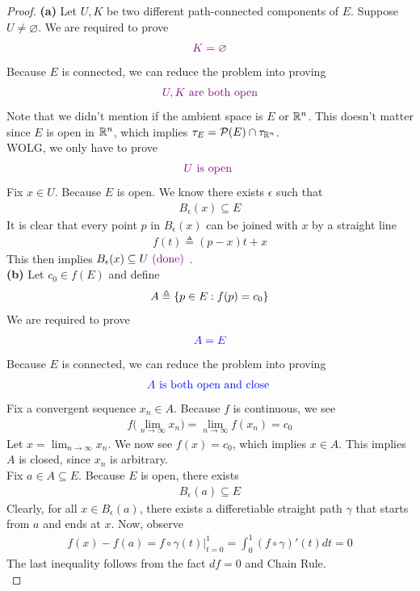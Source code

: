 \documentclass{report}
\begin{document}
\begin{proof}
\textbf{(a)} Let $U,K$ be two different path-connected components of $E$. Suppose $U\neq \varnothing$. We are required to prove 
 \begin{align*}
\textcolor{violet}{K=\varnothing}
\end{align*}
Because $E$ is connected, we can reduce the problem into proving 
\begin{align*}
  \textcolor{violet}{U,K\text{ are both open}}
\end{align*}
Note that we didn't mention if the ambient space is $E$ or  $\mathbb{R}^n$. This doesn't matter since  $E$ is open in  $\mathbb{R}^n$, which implies $\tau_{E}= \mathcal{P}(E)\cap \tau_{\mathbb{R}^n}$.\\

WOLG, we only have to prove 
\begin{align*}
\textcolor{violet}{U\text{ is open }}
\end{align*}
Fix $x \in U$. Because $E$ is open. We know there exists  $\epsilon $ such that 
\begin{align*}
B_\epsilon (x)\subseteq E
\end{align*}
It is clear that every point $p$ in  $B_\epsilon (x)$ can be joined with $x$ by a straight line 
\begin{align*}
f(t)\triangleq (p-x)t+x
\end{align*}
This then implies $B_\epsilon (x)\subseteq U\textcolor{violet}{\text{ (done) }}$.\\

\textbf{(b)} Let $c_0\in f(E)$ and define 
\begin{align*}
A\triangleq \{ p \in E: f(p)=c_0 \}
\end{align*}
We are required to prove 
\begin{align*}
  \textcolor{blue}{A=E}
\end{align*}
Because $E$ is connected, we can reduce the problem into proving 
\begin{align*}
\textcolor{blue}{A\text{ is both open and close }}
\end{align*}
Fix a convergent sequence $x_n \in A$. Because $f$ is continuous, we see 
\begin{align*}
f\Big(\lim_{n\to \infty}x_n \Big)=\lim_{n\to \infty}f(x_n)=c_0
\end{align*}
Let $x=\lim_{n\to \infty}x_n$. We now see $f(x)=c_0$, which implies $x\in A$. This implies $A$ is closed, since  $x_n$ is arbitrary. \\

Fix $a \in A\subseteq E$. Because $E$ is open, there exists 
\begin{align*}
B_\epsilon (a)\subseteq E
\end{align*}
Clearly, for all $x \in B_\epsilon (a)$, there exists a differetiable straight path $\gamma $ that starts from $a$  and ends at $x$. Now, observe 
\begin{align*}
f(x)-f(a)=f\circ \gamma(t)\Big|_{t=0}^1= \int_0^1 (f\circ \gamma )'(t)dt=0
\end{align*}
The last inequality follows from the fact $df=0$ and Chain Rule.\\


\end{proof}
\end{document}
